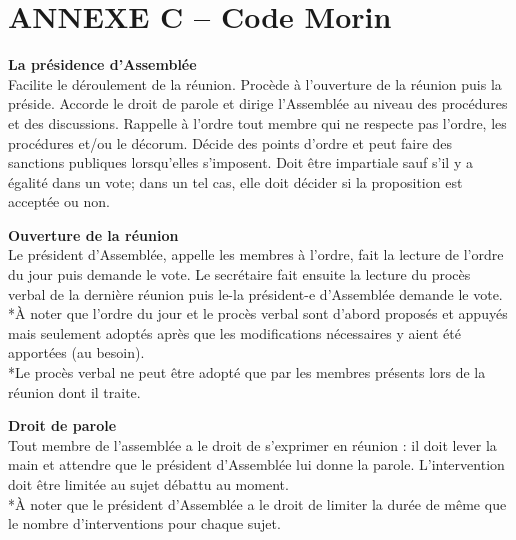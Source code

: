 {\centering\section{ANNEXE C – Code Morin}}
\begin{multicols}{2}
\noindent
\textbf{La présidence d'Assemblée}\\
Facilite le déroulement de la réunion. Procède à l'ouverture de la réunion puis la préside. Accorde le droit de parole et dirige l'Assemblée au  niveau des procédures et des discussions.  Rappelle à l'ordre tout membre qui ne respecte pas  l'ordre, les procédures et/ou le décorum.  Décide des points d'ordre et peut faire des sanctions publiques lorsqu'elles s'imposent.  Doit être impartiale sauf s'il y a égalité dans un vote; dans un tel cas, elle doit décider si la proposition est  acceptée ou non.

\bigskip
\noindent
\textbf{Ouverture de la réunion}\\
Le président d'Assemblée, appelle les membres à l'ordre, fait la lecture de l'ordre du jour puis demande le vote. Le secrétaire fait ensuite la lecture du procès verbal de la dernière réunion puis le-la président-e d'Assemblée demande le vote.\\
*À noter que l'ordre du jour et le procès verbal sont d'abord proposés et appuyés mais seulement adoptés après que les modifications nécessaires y aient été apportées (au besoin).\\
*Le procès verbal ne peut être adopté que par les membres présents lors de la réunion dont il traite.

\bigskip
\noindent
\textbf{Droit de parole}\\
Tout membre de l’assemblée a le droit de s'exprimer en réunion : il doit lever la main et attendre que le président d'Assemblée lui donne la parole. L'intervention doit être limitée au sujet débattu au moment.\\
*À noter que le président d'Assemblée a le droit de limiter la durée de même que le nombre 
d'interventions pour chaque sujet.


\end{multicols}
